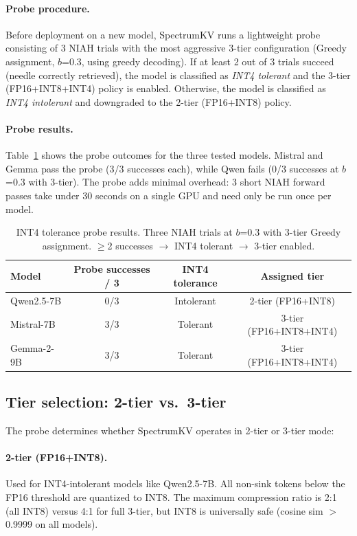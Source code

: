 \documentclass[11pt]{article}
\newcommand{\method}{SpectrumKV}
\theoremstyle{definition}
\theoremstyle{plain}
\begin{document}
\paragraph{Probe procedure.}  Before deployment on a new model, \method{} runs a lightweight probe consisting of 3 NIAH trials with the most aggressive 3-tier configuration (Greedy assignment, $b$=0.3, using greedy decoding).  If at least 2 out of 3 trials succeed (needle correctly retrieved), the model is classified as \emph{INT4 tolerant} and the 3-tier (FP16+INT8+INT4) policy is enabled.  Otherwise, the model is classified as \emph{INT4 intolerant} and downgraded to the 2-tier (FP16+INT8) policy.

\paragraph{Probe results.}  Table~\ref{tab:probe-results} shows the probe outcomes for the three tested models.  Mistral and Gemma pass the probe (3/3 successes each), while Qwen fails (0/3 successes at $b$=0.3 with 3-tier).  The probe adds minimal overhead: 3 short NIAH forward passes take under 30 seconds on a single GPU and need only be run once per model.

\begin{table}[t]
\centering
\caption{INT4 tolerance probe results.  Three NIAH trials at $b$=0.3 with 3-tier Greedy assignment.  $\ge$2 successes $\rightarrow$ INT4 tolerant $\rightarrow$ 3-tier enabled.}
\label{tab:probe-results}
\small
\begin{tabular}{lccc}
\toprule
Model & Probe successes / 3 & INT4 tolerance & Assigned tier \\
\midrule
Qwen2.5-7B & 0/3 & Intolerant & 2-tier (FP16+INT8) \\
Mistral-7B & 3/3 & Tolerant & 3-tier (FP16+INT8+INT4) \\
Gemma-2-9B & 3/3 & Tolerant & 3-tier (FP16+INT8+INT4) \\
\bottomrule
\end{tabular}
\end{table}

\subsection{Tier selection: 2-tier vs.\ 3-tier}
\label{sec:tier-selection}
The probe determines whether \method{} operates in 2-tier or 3-tier mode:

\paragraph{2-tier (FP16+INT8).} Used for INT4-intolerant models like Qwen2.5-7B.  All non-sink tokens below the FP16 threshold are quantized to INT8.  The maximum compression ratio is 2:1 (all INT8) versus 4:1 for full 3-tier, but INT8 is universally safe (cosine sim $>$0.9999 on all models).
\end{document}
